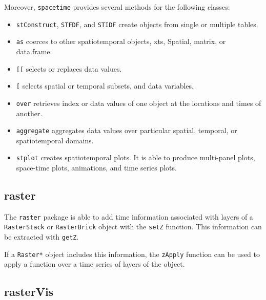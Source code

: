 \documentclass[smallroyalvopaper]{memoir}
\begin{document}
Moreover, \texttt{spacetime} provides several methods for the following classes:

\begin{itemize}
\item \texttt{stConstruct}, \texttt{STFDF}, and \texttt{STIDF} create objects from single or multiple tables.

\item \texttt{as} coerces to other spatiotemporal objects, xts, Spatial, matrix, or data.frame.

\item \texttt{[[} selects or replaces data values.

\item \texttt{[} selects spatial or temporal subsets, and data variables.

\item \texttt{over} retrieves index or data values of one object at the locations and times of another.

\item \texttt{aggregate} aggregates data values over particular spatial, temporal, or spatiotemporal domains.

\item \texttt{stplot} creates spatiotemporal plots. It is able to produce multi-panel plots, space-time plots, animations, and time series plots.
\end{itemize}

\subsection{raster}
\label{sec:orgd71857d}
\label{sec:rasterST}

The \texttt{raster} package \cite{Hijmans2013} is able to add time information associated with layers of a \texttt{RasterStack} or \texttt{RasterBrick} object with the \texttt{setZ} function. This information can be extracted with \texttt{getZ}.

If a \texttt{Raster*} object includes this information, the \texttt{zApply} function can be used to apply a function over a time series of layers of the object.

\subsection{rasterVis}
\label{sec:org2cf7297}
\label{sec:rastervisST}
\end{document}
